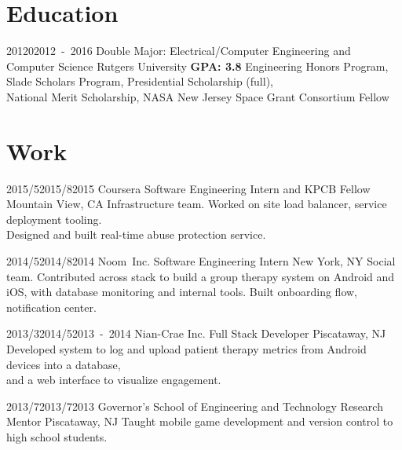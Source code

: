 \documentclass[11pt,letterpaper]{moderncv}
\begin{document}
\maketitle

\section{Education}

\tllabelcventry
    {2012}{0}{2012~-~2016}
    {Double Major: Electrical/Computer Engineering and Computer Science}
    {\break Rutgers University}
    {}
    {\textbf{GPA: 3.8}}
    {Engineering Honors Program, Slade Scholars Program, Presidential Scholarship (full),\\National Merit Scholarship, NASA New Jersey Space Grant Consortium Fellow}

\section{Work}

    \tllabelcventry
        {2015/5}{2015/8}{2015}
        {Coursera}
        {Software Engineering Intern and KPCB Fellow}
        {Mountain View, CA}
        {}
        {Infrastructure team. Worked on site load balancer, service deployment tooling. \\Designed and built real-time abuse protection service. \\}

    \tllabelcventry
        {2014/5}{2014/8}{2014}
        {Noom~Inc.}
        {Software Engineering Intern}
        {New York, NY}
        {}
        {Social team. Contributed across stack to build a group therapy system on Android and iOS, with database monitoring and internal tools. Built onboarding flow, notification center.\\}

    \tllabelcventry
        {2013/3}{2014/5}{2013~-~2014} %
        {Nian-Crae Inc.}
        {Full Stack Developer}
        {Piscataway, NJ}
        {}
        {Developed system to log and upload patient therapy metrics from Android devices into a database,\\and a web interface to visualize engagement.\\}

    \tllabelcventry
        {2013/7}{2013/7}{2013}
        {Governor's School of Engineering and Technology}
        {Research Mentor}
        {Piscataway, NJ}
        {}
        {Taught mobile game development and version control to high school students.}
\end{document}
